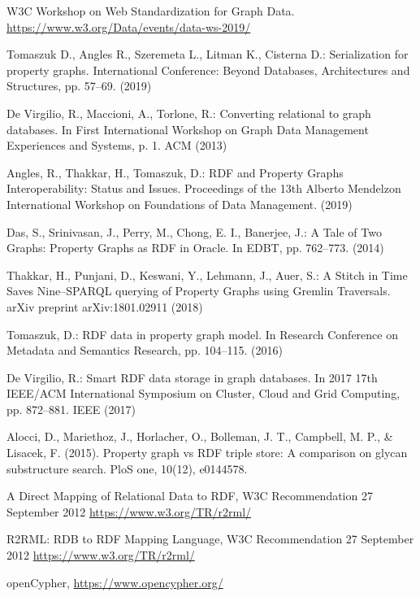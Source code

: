 \documentclass[runningheads]{llncs}
\begin{document}
\begin{thebibliography}{8}
W3C Workshop on Web Standardization for Graph Data. \url{https://www.w3.org/Data/events/data-ws-2019/}

Tomaszuk D., Angles R., Szeremeta L., Litman K., Cisterna D.:
Serialization for property graphs. International Conference: Beyond Databases, Architectures and Structures, pp. 57--69. (2019)

De Virgilio, R., Maccioni, A., Torlone, R.: Converting relational to graph databases. In First International Workshop on Graph Data Management Experiences and Systems, p. 1. ACM (2013)

Angles, R., Thakkar, H., Tomaszuk, D.: RDF and Property Graphs Interoperability: Status and Issues. Proceedings of the 13th Alberto Mendelzon International Workshop on Foundations of Data Management. (2019)

Das, S., Srinivasan, J., Perry, M., Chong, E. I., Banerjee, J.: A Tale of Two Graphs: Property Graphs as RDF in Oracle. In EDBT, pp. 762--773. (2014)

Thakkar, H., Punjani, D., Keswani, Y., Lehmann, J., Auer, S.: A Stitch in Time Saves Nine--SPARQL querying of Property Graphs using Gremlin Traversals. arXiv preprint arXiv:1801.02911 (2018)

Tomaszuk, D.: RDF data in property graph model. In Research Conference on Metadata and Semantics Research, pp. 104--115. (2016)

De Virgilio, R.: Smart RDF data storage in graph databases. In 2017 17th IEEE/ACM International Symposium on Cluster, Cloud and Grid Computing, pp. 872--881. IEEE (2017)

Alocci, D., Mariethoz, J., Horlacher, O., Bolleman, J. T., Campbell, M. P., & Lisacek, F. (2015). Property graph vs RDF triple store: A comparison on glycan substructure search. PloS one, 10(12), e0144578.

A Direct Mapping of Relational Data to RDF, W3C Recommendation 27 September 2012 \url{https://www.w3.org/TR/r2rml/}

R2RML: RDB to RDF Mapping Language, W3C Recommendation 27 September 2012 \url{https://www.w3.org/TR/r2rml/}

openCypher, \url{https://www.opencypher.org/}



\end{thebibliography}
\end{document}

